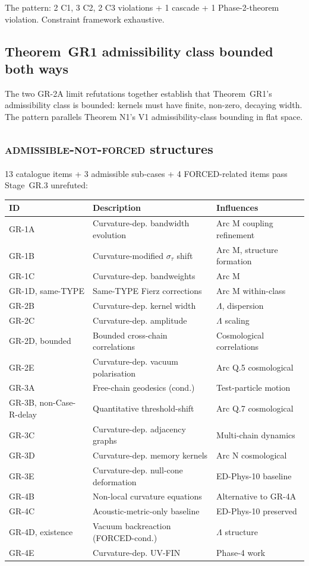 \documentclass[11pt,a4paper]{article}
\begin{document}
The pattern: 2 C1, 3 C2, 2 C3 violations + 1 cascade + 1 Phase-2-theorem violation. Constraint framework exhaustive.

\subsection{Theorem~GR1 admissibility class bounded both ways}

The two GR-2A limit refutations together establish that Theorem~GR1's admissibility class is bounded: kernels must have finite, non-zero, decaying width. The pattern parallels Theorem N1's V1 admissibility-class bounding in flat space.

\subsection{\textsc{admissible-not-forced} structures}

13 catalogue items + 3 admissible sub-cases + 4 FORCED-related items pass Stage~GR.3 unrefuted:
\begin{center}
\begin{tabular}{lll}
\hline
ID & Description & Influences \\
\hline
GR-1A & Curvature-dep. bandwidth evolution & Arc M coupling refinement \\
GR-1B & Curvature-modified $\sigma_\tau$ shift & Arc M, structure formation \\
GR-1C & Curvature-dep. bandweights & Arc M \\
GR-1D, same-TYPE & Same-TYPE Fierz corrections & Arc M within-class \\
GR-2B & Curvature-dep. kernel width & $\Lambda$, dispersion \\
GR-2C & Curvature-dep. amplitude & $\Lambda$ scaling \\
GR-2D, bounded & Bounded cross-chain correlations & Cosmological correlations \\
GR-2E & Curvature-dep. vacuum polarisation & Arc Q.5 cosmological \\
GR-3A & Free-chain geodesics (cond.) & Test-particle motion \\
GR-3B, non-Case-R-delay & Quantitative threshold-shift & Arc Q.7 cosmological \\
GR-3C & Curvature-dep. adjacency graphs & Multi-chain dynamics \\
GR-3D & Curvature-dep. memory kernels & Arc N cosmological \\
GR-3E & Curvature-dep. null-cone deformation & ED-Phys-10 baseline \\
GR-4B & Non-local curvature equations & Alternative to GR-4A \\
GR-4C & Acoustic-metric-only baseline & ED-Phys-10 preserved \\
GR-4D, existence & Vacuum backreaction (FORCED-cond.) & $\Lambda$ structure \\
GR-4E & Curvature-dep. UV-FIN & Phase-4 work \\
\hline
\end{tabular}
\end{center}
\end{document}
